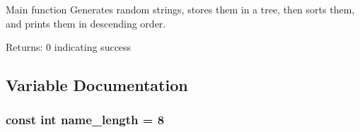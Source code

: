Main function Generates random strings, stores them in a tree, then sorts them, and prints them in descending order. \begin{Desc}
\item[Returns:]0 indicating success \end{Desc}


\subsection{Variable Documentation}
\subsubsection{\setlength{\rightskip}{0pt plus 5cm}const int \bf{name\_\-length} = 8}\label{randomsort_8c_349e77fc8513c4129c26c3fb44bf7294}


